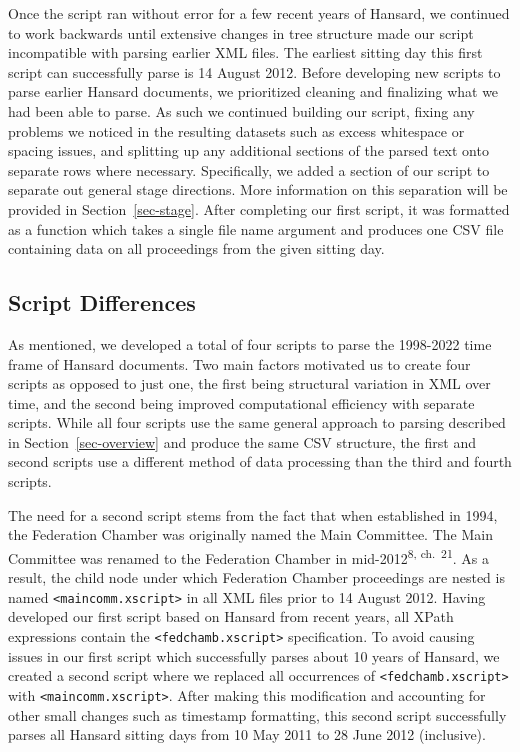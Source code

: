 \documentclass[
  letterpaper,
  DIV=11,
  numbers=noendperiod]{scrartcl}
\begin{document}
Once the script ran without error for a few recent years of Hansard, we
continued to work backwards until extensive changes in tree structure
made our script incompatible with parsing earlier XML files. The
earliest sitting day this first script can successfully parse is 14
August 2012. Before developing new scripts to parse earlier Hansard
documents, we prioritized cleaning and finalizing what we had been able
to parse. As such we continued building our script, fixing any problems
we noticed in the resulting datasets such as excess whitespace or
spacing issues, and splitting up any additional sections of the parsed
text onto separate rows where necessary. Specifically, we added a
section of our script to separate out general stage directions. More
information on this separation will be provided in
Section~\ref{sec-stage}. After completing our first script, it was
formatted as a function which takes a single file name argument and
produces one CSV file containing data on all proceedings from the given
sitting day.

\hypertarget{sec-diff}{%
\subsection{Script Differences}\label{sec-diff}}

As mentioned, we developed a total of four scripts to parse the
1998-2022 time frame of Hansard documents. Two main factors motivated us
to create four scripts as opposed to just one, the first being
structural variation in XML over time, and the second being improved
computational efficiency with separate scripts. While all four scripts
use the same general approach to parsing described in
Section~\ref{sec-overview} and produce the same CSV structure, the first
and second scripts use a different method of data processing than the
third and fourth scripts.

The need for a second script stems from the fact that when established
in 1994, the Federation Chamber was originally named the Main Committee.
The Main Committee was renamed to the Federation Chamber in
mid-2012\textsuperscript{8, ch.~21}. As a result, the child node under
which Federation Chamber proceedings are nested is named
\texttt{\textless{}maincomm.xscript\textgreater{}} in all XML files
prior to 14 August 2012. Having developed our first script based on
Hansard from recent years, all XPath expressions contain the
\texttt{\textless{}fedchamb.xscript\textgreater{}} specification. To
avoid causing issues in our first script which successfully parses about
10 years of Hansard, we created a second script where we replaced all
occurrences of \texttt{\textless{}fedchamb.xscript\textgreater{}} with
\texttt{\textless{}maincomm.xscript\textgreater{}}. After making this
modification and accounting for other small changes such as timestamp
formatting, this second script successfully parses all Hansard sitting
days from 10 May 2011 to 28 June 2012 (inclusive).
\end{document}
